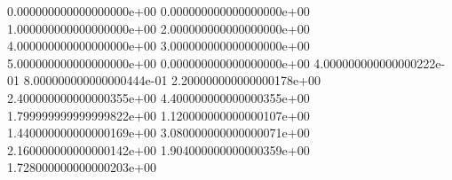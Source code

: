0.000000000000000000e+00 0.000000000000000000e+00
1.000000000000000000e+00 2.000000000000000000e+00
4.000000000000000000e+00 3.000000000000000000e+00
5.000000000000000000e+00 0.000000000000000000e+00
4.000000000000000222e-01 8.000000000000000444e-01
2.200000000000000178e+00 2.400000000000000355e+00
4.400000000000000355e+00 1.799999999999999822e+00
1.120000000000000107e+00 1.440000000000000169e+00
3.080000000000000071e+00 2.160000000000000142e+00
1.904000000000000359e+00 1.728000000000000203e+00
